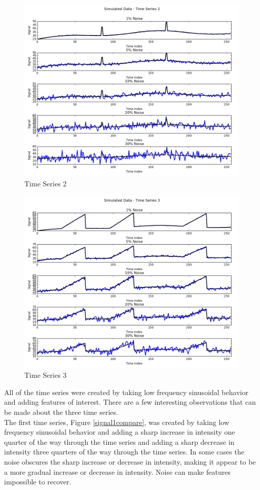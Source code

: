\documentclass[11pt]{article}
\theoremstyle{definition}
\begin{document}
\begin{figure}
\centering
\includegraphics[width = 0.75 \textwidth]{Signal2Compare.png}
\caption{Time Series 2}
\label{signal2compare}
\end{figure}

\begin{figure}
\centering
\includegraphics[width = 0.75 \textwidth]{Signal3Compare.png}
\caption{Time Series 3}
\label{signal3compare}
\end{figure}

All of the time series were created by taking low frequency sinusoidal behavior and adding features of interest. There are a few interesting observations that can be made about the three time series.\\

The first time series, Figure \ref{signal1compare}, was created by taking low frequency sinusoidal behavior and adding a sharp increase in intensity one quarter of the way through the time series and adding a sharp decrease in intensity three quarters of the way through the time series. In some cases the noise obscures the sharp increase or decrease in intensity, making it appear to be a more gradual increase or decrease in intensity. Noise can make features impossible to recover.\\
\end{document}
